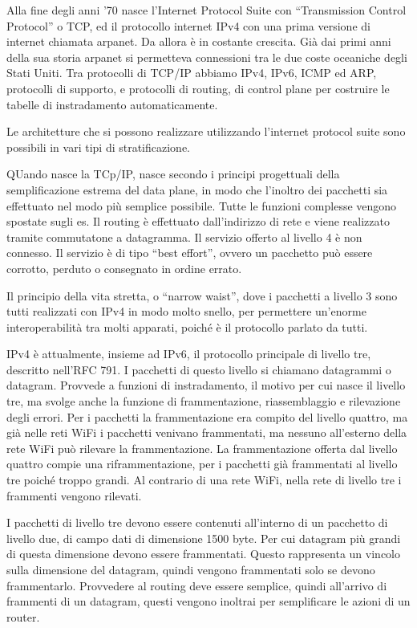 \documentclass{article}
\numberwithin{equation}{subsection}
\begin{document}
Alla fine degli anni '70 nasce l'Internet Protocol Suite con ``Transmission Control Protocol'' o TCP, ed il protocollo internet IPv4 con una prima versione di internet 
chiamata arpanet. Da allora è in costante crescita. Già dai primi anni della sua storia arpanet si permetteva connessioni tra le due coste oceaniche degli Stati 
Uniti. 
Tra  protocolli di TCP/IP abbiamo IPv4, IPv6, ICMP ed ARP, protocolli di supporto, e protocolli di routing, di control plane per costruire le tabelle di instradamento 
automaticamente. 

Le architetture che si possono realizzare utilizzando l'internet protocol suite sono possibili in vari tipi di stratificazione. 

QUando nasce la TCp/IP, nasce secondo i principi progettuali della semplificazione estrema del data plane, in modo che l'inoltro dei pacchetti sia 
effettuato nel modo più semplice possibile. Tutte le funzioni complesse vengono spostate sugli es. Il routing è effettuato dall'indirizzo di rete e viene realizzato 
tramite commutatone a datagramma. Il servizio offerto al livello 4 è non connesso. Il servizio è di tipo ``best effort'', ovvero un pacchetto può essere corrotto, 
perduto o consegnato in ordine errato. 

Il principio della vita stretta, o ``narrow waist'', dove i pacchetti a livello 3 sono tutti realizzati con IPv4 in modo molto snello, per permettere un'enorme 
interoperabilità tra molti apparati, poiché è il protocollo parlato da tutti. 

IPv4 è attualmente, insieme ad IPv6, il protocollo principale di livello tre, descritto nell'RFC 791. I pacchetti di questo livello si chiamano datagrammi o datagram. 
Provvede a funzioni di instradamento, il motivo per cui nasce il livello tre, ma svolge anche la funzione di frammentazione, riassemblaggio e rilevazione degli errori. 
Per i pacchetti la frammentazione era compito del livello quattro, ma già nelle reti WiFi i pacchetti venivano frammentati, ma nessuno all'esterno della rete 
WiFi può rilevare la frammentazione. La frammentazione offerta dal livello quattro compie una riframmentazione, per i pacchetti già frammentati al livello tre 
poiché troppo grandi. Al contrario di una rete WiFi, nella rete di livello tre i frammenti vengono rilevati. 

I pacchetti di livello tre devono essere contenuti all'interno di un pacchetto di livello due, di campo dati di dimensione 1500 byte. Per cui datagram più grandi 
di questa dimensione devono essere frammentati. 
Questo rappresenta un vincolo sulla dimensione del datagram, quindi vengono frammentati solo se devono frammentarlo. Provvedere al routing deve essere semplice, quindi 
all'arrivo di frammenti di un datagram, questi vengono inoltrai per semplificare le azioni di un router. 
\end{document}

